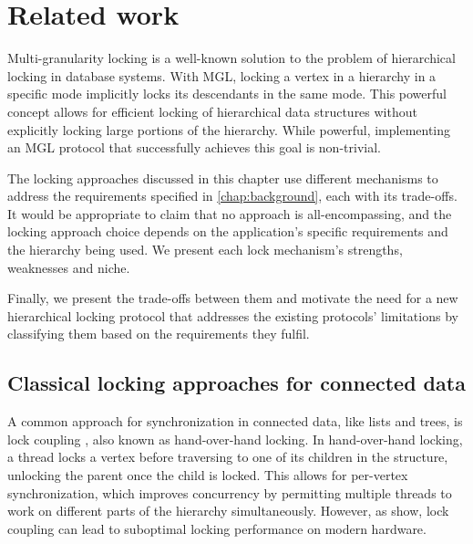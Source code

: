 \chapter{Related work} \label{chap:relatedwork}


Multi-granularity locking is a well-known solution to the problem of hierarchical locking in database systems. 
With MGL, locking a vertex in a hierarchy in a specific mode implicitly locks its descendants in the same mode. 
This powerful concept allows for efficient locking of hierarchical data structures without explicitly locking large portions of the hierarchy.
While powerful, implementing an MGL protocol that successfully achieves this goal is non-trivial. 


The locking approaches discussed in this chapter use different mechanisms to address the requirements specified in \cref{chap:background}, each with its trade-offs. 
It would be appropriate to claim that no approach is all-encompassing, and the locking approach choice depends on the application's specific requirements and the hierarchy being used. We present each lock mechanism's strengths, weaknesses and niche.

Finally, we present the trade-offs between them and motivate the need for a new hierarchical locking protocol that addresses the existing protocols' limitations by classifying them based on the requirements they fulfil.


\section{Classical locking approaches for connected data}

A common approach for synchronization in connected data, like lists and trees, is lock coupling \cite{DBLP:journals/acta/BayerS77}, also known as hand-over-hand locking. In hand-over-hand locking, a thread locks a vertex before traversing to one of its children in the structure, unlocking the parent once the child is locked. 
This allows for per-vertex synchronization, which improves concurrency by permitting multiple threads to work on different parts of the hierarchy simultaneously. 
However, as \citet{LeisH019} show, lock coupling can lead to suboptimal locking performance on modern hardware.


